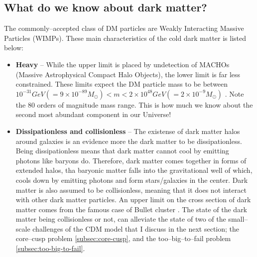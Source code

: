 \documentclass[paper=a4, fontsize=11pt]{scrartcl} %
\numberwithin{equation}{section} %
\numberwithin{figure}{section} %
\numberwithin{table}{section} %
\newcommand{\ignore}[1]{}
\begin{document}
\subsection{What do we know about dark matter?}
\label{subsec:current state}
The commonly--accepted class of DM particles are Weakly Interacting Massive Particles (WIMPs). These main characteristics of the cold dark matter is listed below:
  \begin{itemize}
  \item {\bf Heavy} -- \ignore{The observational upper and lower bounds for dark matter particles come from different sources. }While the upper limit is placed by undetection of MACHOs (Massive Astrophysical Compact Halo Objects), the lower limit is far less constrained.\ignore{ Neither the Kepler satellite \citep[][]{Griest+2014}, nor microlensing surveys \citep[][]{Alcock+1998, Yoo+2004} did not detect MACHOs as predicted.} These limits expect the DM particle mass to be between $10^\mathrm{-31} GeV (= 9\times 10^\mathrm{-89} M_\odot) < m < 2\times 10^\mathrm{48} GeV (= 2 \times 10^\mathrm{-9} M_\odot)$ \citep[\ignore{47 for lower bound}][\ignore{ and 42 \& 43 for the upper bound}]{Hu+2000, Alcock+1998, Yoo+2004}. Note the 80 orders of magnitude mass range. This is how much we know about the second most abundant component in our Universe!
  \item {\bf Dissipationless and collisionless} -- The existense of dark matter halos around galaxies is an evidence more the dark matter to be dissipationless. Being dissipationless means that dark matter cannot cool by emitting photons like baryons do. Therefore, dark matter comes together in forms of extended halos, tha baryonic matter falls into the gravitational well of which, cools down by emitting photons and form stars/galaxies in the center. Dark matter is also assumed to be collisionless, meaning that it does not interact with other dark matter particles. An upper limit on the cross section of dark matter comes from the famous case of Bullet cluster \citep[][]{Clowe+2006}. The state of the dark matter being collisionless or not, can alleviate the state of two of the small--scale challenges of the CDM model that I discuss in the next section; the core--cusp problem \ref{subsec:core-cusp}, and the too--big--to--fail problem \ref{subsec:too-big-to-fail}.


\end{itemize}
\end{document}
